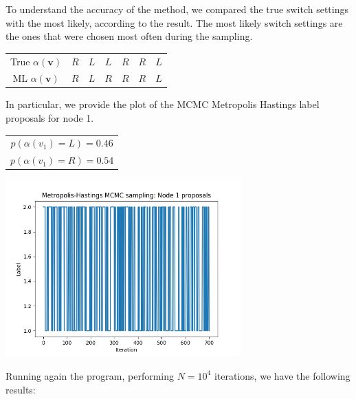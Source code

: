 \documentclass[]{article}
\begin{document}
To understand the accuracy of the method, we compared the true switch settings with the most likely, according to the result. The most likely switch settings are the ones that were chosen most often during the sampling. 
\begin{center}
	\begin{tabular}{| c | c | c | c | c | c | c |}
		True $\alpha(\mathbf{v})$ & $R$ & $L$ & $L$ & $R$ & $R$ & $L$ \\
		ML $\alpha(\mathbf{v})$ & $R$ & $L$ & $R$ & $R$ & $R$ & $L$ \\
	\end{tabular}
\end{center}
In particular, we provide the plot of the MCMC Metropolis Hastings label proposals for node 1.
\begin{center}
	\begin{tabular}{| c |}
		$p(\alpha(v_1)=L) = 0.46 $ \\
		$p(\alpha(v_1)=R) = 0.54 $ \\
	\end{tabular}
\end{center}
\begin{center}
	\includegraphics[height=6.8cm]{task3/V_6_T_6_N_1000_Node1.png}
\end{center}
Running again the program, performing $N=10^4$ iterations, we have the following results:
\end{document}
